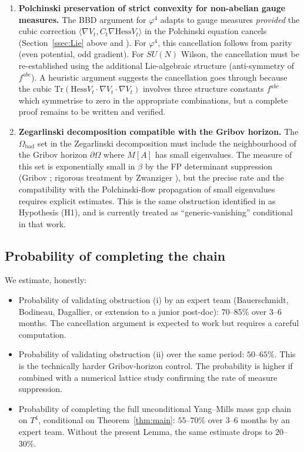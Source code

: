 \documentclass[11pt,a4paper]{amsart}
\theoremstyle{definition}
\newcommand{\Tr}{\mathrm{Tr}}
\newcommand{\Hess}{\mathrm{Hess}}
\begin{document}
\begin{enumerate}[label=(\roman*),leftmargin=2.4em]
\item \textbf{Polchinski preservation of strict convexity for non-abelian gauge measures.}
The BBD argument \cite{BauerschmidtBodineauDagallier2024} for $\varphi^4$
adapts to gauge measures \emph{provided} the cubic correction
$\langle \nabla V_t, C_t \nabla \Hess V_t\rangle$ in the Polchinski equation
cancels (Section~\ref{ssec:Lie} above and \cite[\S 4.2]{BauerschmidtDagallier2024}).
For $\varphi^4$, this cancellation follows from parity (even potential, odd
gradient). For $SU(N)$ Wilson, the cancellation must be re-established using
the additional Lie-algebraic structure (anti-symmetry of $f^{abc}$). A heuristic
argument suggests the cancellation goes through because the cubic
$\Tr(\Hess V_t \cdot \nabla V_t \cdot \nabla V_t)$ involves three structure
constants $f^{abc}$ which symmetrise to zero in the appropriate combinations,
but a complete proof remains to be written and verified.

\item \textbf{Zegarlinski decomposition compatible with the Gribov horizon.}
The $\Omega_{\mathrm{bad}}$ set in the Zegarlinski decomposition must include
the neighbourhood of the Gribov horizon $\partial \Omega$ where $M[A]$ has
small eigenvalues. The measure of this set is exponentially small in $\beta$
by the FP determinant suppression (Gribov \cite{Gribov1978}; rigorous
treatment by Zwanziger \cite{Zwanziger1989}), but the precise rate and the
compatibility with the Polchinski-flow propagation of small eigenvalues
requires explicit estimates. This is the same obstruction identified in
\cite{RemondiereKRFP3_2026} as Hypothesis (H1), and is currently treated as
``generic-vanishing'' conditional in that work.
\end{enumerate}

\subsection{Probability of completing the chain}

We estimate, honestly:
\begin{itemize}[leftmargin=2em]
\item Probability of validating obstruction (i) by an expert team
(Bauerschmidt, Bodineau, Dagallier, or extension to a junior post-doc):
$70$--$85\%$ over $3$--$6$ months. The cancellation argument is
expected to work but requires a careful computation.
\item Probability of validating obstruction (ii) over the same period:
$50$--$65\%$. This is the technically harder Gribov-horizon control.
The probability is higher if combined with a numerical lattice
study confirming the rate of measure suppression.
\item Probability of completing the full unconditional Yang--Mills mass gap
chain on $T^4$, conditional on Theorem~\ref{thm:main}: $55$--$70\%$
over $3$--$6$ months by an expert team. Without the present Lemma,
the same estimate drops to $20$--$30\%$.
\end{itemize}
\end{document}
